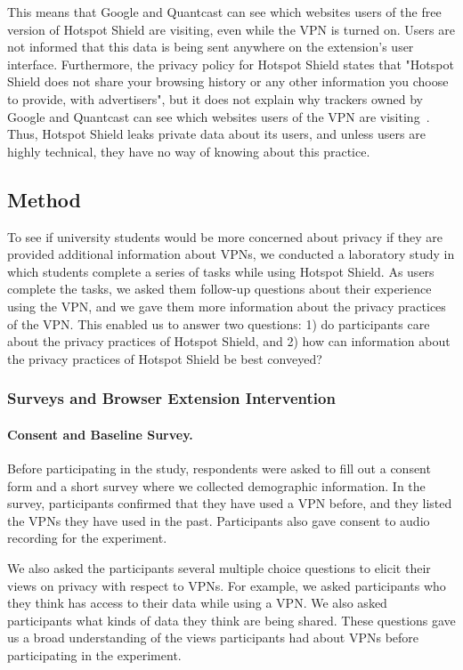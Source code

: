 This means that Google and Quantcast can see which websites users of the free version of Hotspot Shield are visiting, even while the VPN is turned on. Users are not informed that this data is being sent anywhere on the extension's user interface. Furthermore, the privacy policy for Hotspot Shield states that "Hotspot Shield does not share your browsing history or any other information you choose to provide, with advertisers", but it does not explain why trackers owned by Google and Quantcast can see which websites users of the VPN are visiting~\cite{hotspot_privacy}. Thus, Hotspot Shield leaks private data about its users, and unless users are highly technical, they have no way of knowing about this practice.

\subsection{Method}\label{sec:experiment_method}
To see if university students would be more concerned about privacy if they are provided additional information about VPNs, we conducted a laboratory study in which students complete a series of tasks while using Hotspot Shield. As users complete the tasks, we asked them follow-up questions about their experience using the VPN, and we gave them more information about the privacy practices of the VPN. This enabled us to answer two questions: 1) do participants care about the privacy practices of Hotspot Shield, and 2) how can information about the privacy practices of Hotspot Shield be best conveyed?

\subsubsection{Surveys and Browser Extension Intervention}

\paragraph{Consent and Baseline Survey.}
Before participating in the study, respondents were asked to fill out a
consent form and a short survey where we collected demographic information.
In the survey, participants confirmed that they have used a VPN before, and
they listed the VPNs they have used in the past.  Participants also gave
consent to audio recording for the experiment.

We also asked the participants several multiple choice questions to elicit
their views on privacy with respect to VPNs.  For example, we asked
participants who they think has access to their data while using a VPN.  We
also asked participants what kinds of data they think are being shared.  These
questions gave us a broad understanding of the views participants had about
VPNs before participating in the experiment.

